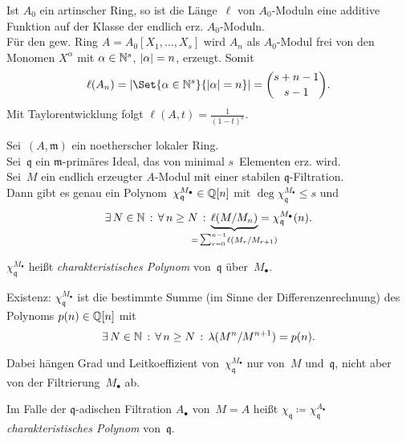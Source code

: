 \documentclass{cheat-sheet}
\newcommand{\qqq}{\mathfrak{q}}
\newcommand{\mmm}{\mathfrak{m}}
\begin{document}
\begin{bsp}
  Ist $A_0$ ein artinscher Ring, so ist die Länge~$\ell$ von $A_0$-Moduln eine additive Funktion auf der Klasse der endlich erz. $A_0$-Moduln. \\
  Für den gew. Ring $A = A_0 [X_1, \ldots, X_s]$ wird $A_n$ als $A_0$-Modul frei von den Monomen $X^\alpha$ mit $\alpha \in \mathbb{N}^s$, $\lvert\alpha\rvert = n$, erzeugt.
  Somit
  \[
    \ell(A_n) = \abs{\Set{\alpha \in \N^s}{\abs{\alpha} = n}} = \binom{s+n-1}{s-1}.
  \]
  Mit Taylorentwicklung folgt \enspace
  $
    \ell(A, t) = \tfrac{1}{(1-t)^s}.
  $
\end{bsp}


\begin{prop}
  Sei~$(A, \mmm)$ ein noetherscher lokaler Ring. \\
  Sei~$\qqq$ ein $\mmm$-primäres Ideal, das von minimal $s$~Elementen erz. wird. \\
  Sei~$M$ ein endlich erzeugter $A$-Modul mit einer stabilen $\qqq$-Filtration. \\
  Dann gibt es genau ein Polynom~$\chi_\qqq^{M_\bullet} \in \Q [n]$ mit $\deg \chi_\qqq^{M_\bullet} \leq s$ und
  \[
    \ex{N \in \N} \fa{n \geq N} \underbrace{\ell(M/M_n)}_{\mathclap{= \, {\sum}_{r=0}^{n-1} \ell(M_r/M_{r+1})}} = \chi_\qqq^{M_\bullet}(n).
  \]
\end{prop}

\begin{defn}
  $\chi_\qqq^{M_\bullet}$ heißt \emph{charakteristisches Polynom} von~$\qqq$ über~$M_\bullet$.
\end{defn}

\begin{beweisidee}
  Existenz: $\chi_\qqq^{M_\bullet}$ ist die bestimmte Summe (im Sinne der Differenzenrechnung) des Polynoms $p(n) \in \mathbb{Q} [n]$ mit
  \[
    \exists \, {N \in \mathbb{N}} \,:\, \forall \, {n \geq N} \,:\, \lambda(M^n / M^{n+1}) = p(n).
  \]
\end{beweisidee}

\begin{bem}
  Dabei hängen Grad und Leitkoeffizient von~$\chi_\qqq^{M_\bullet}$ nur von~$M$ und~$\qqq$, nicht aber von der Filtrierung~$M_\bullet$ ab.
\end{bem}

\begin{nota}
  Im Falle der $\qqq$-adischen Filtration $A_\bullet$ von~$M = A$ heißt $\chi_\qqq \coloneqq \chi_\qqq^{A_\bullet}$ \textit{charakteristisches Polynom} von~$\qqq$.
\end{nota}
\end{document}
